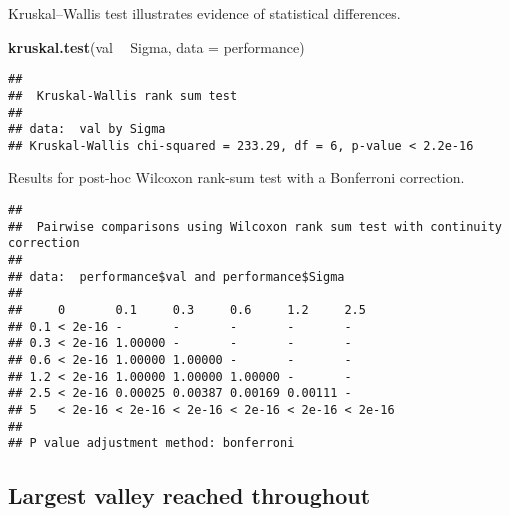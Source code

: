 \documentclass[]{book}
\newenvironment{Shaded}{\begin{snugshade}}{\end{snugshade}}
\newcommand{\DataTypeTok}[1]{\textcolor[rgb]{0.13,0.29,0.53}{#1}}
\newcommand{\KeywordTok}[1]{\textcolor[rgb]{0.13,0.29,0.53}{\textbf{#1}}}
\newcommand{\NormalTok}[1]{#1}
\newcommand{\OperatorTok}[1]{\textcolor[rgb]{0.81,0.36,0.00}{\textbf{#1}}}
\newcommand{\OtherTok}[1]{\textcolor[rgb]{0.56,0.35,0.01}{#1}}
\newcommand{\StringTok}[1]{\textcolor[rgb]{0.31,0.60,0.02}{#1}}
\begin{document}
Kruskal--Wallis test illustrates evidence of statistical differences.

\begin{Shaded}
\begin{Highlighting}[]
\KeywordTok{kruskal.test}\NormalTok{(val }\OperatorTok{~}\StringTok{ }\NormalTok{Sigma, }\DataTypeTok{data =}\NormalTok{ performance)}
\end{Highlighting}
\end{Shaded}

\begin{verbatim}
## 
##  Kruskal-Wallis rank sum test
## 
## data:  val by Sigma
## Kruskal-Wallis chi-squared = 233.29, df = 6, p-value < 2.2e-16
\end{verbatim}

Results for post-hoc Wilcoxon rank-sum test with a Bonferroni correction.

\begin{Shaded}
\end{Shaded}

\begin{verbatim}
## 
##  Pairwise comparisons using Wilcoxon rank sum test with continuity correction 
## 
## data:  performance$val and performance$Sigma 
## 
##     0       0.1     0.3     0.6     1.2     2.5    
## 0.1 < 2e-16 -       -       -       -       -      
## 0.3 < 2e-16 1.00000 -       -       -       -      
## 0.6 < 2e-16 1.00000 1.00000 -       -       -      
## 1.2 < 2e-16 1.00000 1.00000 1.00000 -       -      
## 2.5 < 2e-16 0.00025 0.00387 0.00169 0.00111 -      
## 5   < 2e-16 < 2e-16 < 2e-16 < 2e-16 < 2e-16 < 2e-16
## 
## P value adjustment method: bonferroni
\end{verbatim}

\hypertarget{largest-valley-reached-throughout-17}{%
\subsection{Largest valley reached throughout}\label{largest-valley-reached-throughout-17}}
\end{document}
